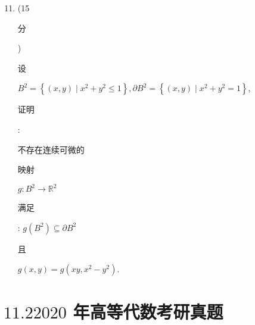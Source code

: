 \documentclass[10pt]{article}
\begin{document}
\begin{enumerate}
  \setcounter{enumi}{10}
  \item (15 \begin{CJK}{UTF8}{mj}分\end{CJK}) \begin{CJK}{UTF8}{mj}设\end{CJK} $B^{2}=\left\{(x, y) \mid x^{2}+y^{2} \leq 1\right\}, \partial B^{2}=\left\{(x, y) \mid x^{2}+y^{2}=1\right\}$, \begin{CJK}{UTF8}{mj}证明\end{CJK}: \begin{CJK}{UTF8}{mj}不存在连续可微的\end{CJK} \begin{CJK}{UTF8}{mj}映射\end{CJK} $g: B^{2} \rightarrow \mathbb{R}^{2}$ \begin{CJK}{UTF8}{mj}满足\end{CJK}: $g\left(B^{2}\right) \subseteq \partial B^{2}$ \begin{CJK}{UTF8}{mj}且\end{CJK} $g(x, y)=g\left(x y, x^{2}-y^{2}\right)$.
\end{enumerate}
\section{$11.22020$ 年高等代数考研真题}
\end{document}
